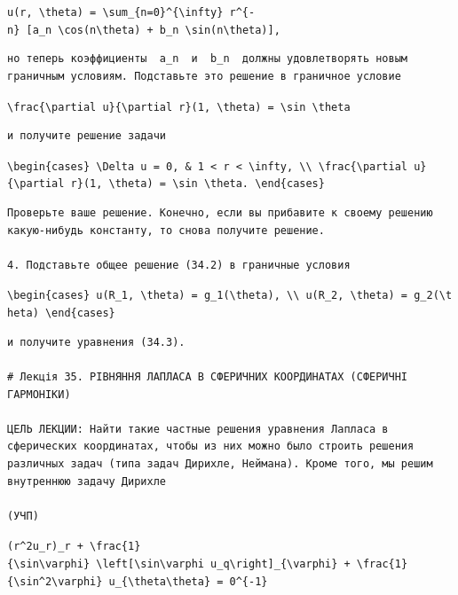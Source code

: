 \documentclass[
  ukrainian,
]{article}
\begin{document}
\texttt{u(r,\ \textbackslash{}theta)\ =\ \textbackslash{}sum\_\{n=0\}\^{}\{\textbackslash{}infty\}\ r\^{}\{-n\}\ {[}a\_n\ \textbackslash{}cos(n\textbackslash{}theta)\ +\ b\_n\ \textbackslash{}sin(n\textbackslash{}theta){]},}

\begin{verbatim}
но теперь коэффициенты  a_n  и  b_n  должны удовлетворять новым граничным условиям. Подставьте это решение в граничное условие
\end{verbatim}

\texttt{\textbackslash{}frac\{\textbackslash{}partial\ u\}\{\textbackslash{}partial\ r\}(1,\ \textbackslash{}theta)\ =\ \textbackslash{}sin\ \textbackslash{}theta}

\begin{verbatim}
и получите решение задачи
\end{verbatim}

\texttt{\textbackslash{}begin\{cases\}\ \textbackslash{}Delta\ u\ =\ 0,\ \&\ 1\ \textless{}\ r\ \textless{}\ \textbackslash{}infty,\ \textbackslash{}\textbackslash{}\ \textbackslash{}frac\{\textbackslash{}partial\ u\}\{\textbackslash{}partial\ r\}(1,\ \textbackslash{}theta)\ =\ \textbackslash{}sin\ \textbackslash{}theta.\ \textbackslash{}end\{cases\}}

\begin{verbatim}
Проверьте ваше решение. Конечно, если вы прибавите к своему решению какую-нибудь константу, то снова получите решение.

4. Подставьте общее решение (34.2) в граничные условия
\end{verbatim}

\texttt{\textbackslash{}begin\{cases\}\ u(R\_1,\ \textbackslash{}theta)\ =\ g\_1(\textbackslash{}theta),\ \textbackslash{}\textbackslash{}\ u(R\_2,\ \textbackslash{}theta)\ =\ g\_2(\textbackslash{}theta)\ \textbackslash{}end\{cases\}}

\begin{verbatim}
и получите уравнения (34.3).

# Лекція 35. РІВНЯННЯ ЛАПЛАСА В СФЕРИЧНИХ КООРДИНАТАХ (СФЕРИЧНІ ГАРМОНІКИ)

ЦЕЛЬ ЛЕКЦИИ: Найти такие частные решения уравнения Лапласа в сферических координатах, чтобы из них можно было строить решения различных задач (типа задач Дирихле, Неймана). Кроме того, мы решим внутреннюю задачу Дирихле

(УЧП)
\end{verbatim}

\texttt{(r\^{}2u\_r)\_r\ +\ \textbackslash{}frac\{1\}\{\textbackslash{}sin\textbackslash{}varphi\}\ \textbackslash{}left{[}\textbackslash{}sin\textbackslash{}varphi\ u\_q\textbackslash{}right{]}\_\{\textbackslash{}varphi\}\ +\ \textbackslash{}frac\{1\}\{\textbackslash{}sin\^{}2\textbackslash{}varphi\}\ u\_\{\textbackslash{}theta\textbackslash{}theta\}\ =\ 0\^{}\{-1\}}
\end{document}
